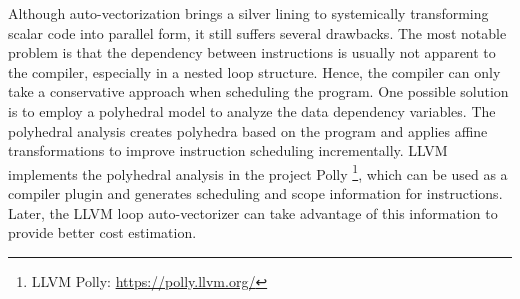 Although auto-vectorization brings a silver lining to systemically transforming scalar code into parallel form, it still suffers several drawbacks. The most notable problem is that the dependency between instructions is usually not apparent to the compiler, especially in a nested loop structure. Hence, the compiler can only take a conservative approach when scheduling the program. One possible solution is to employ a polyhedral model \cite{polyhedral} to analyze the data dependency variables. The polyhedral analysis creates polyhedra based on the program and applies affine transformations to improve instruction scheduling incrementally. LLVM implements the polyhedral analysis in the project Polly \cite{polly} \footnote{LLVM Polly: \url{https://polly.llvm.org/}}, which can be used as a compiler plugin and generates scheduling and scope information for instructions. Later, the LLVM loop auto-vectorizer can take advantage of this information to provide better cost estimation. 